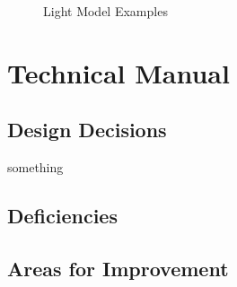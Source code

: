 \documentclass[10pt]{report}
\begin{document}
\begin{figure}[!h]
\caption{Light Model Examples}
\label{fig:light}
\end{figure}

\clearpage
\section*{Technical Manual}
\subsection*{Design Decisions}

\begin{description}
\item[something]
\end{description}

\subsection*{Deficiencies}

\subsection*{Areas for Improvement}
\end{document}
